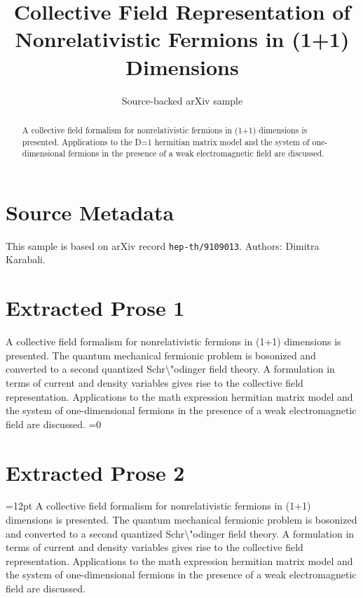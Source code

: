 \documentclass[11pt]{article}
\title{Collective Field Representation of Nonrelativistic Fermions in (1+1)
  Dimensions}
\author{Source-backed arXiv sample}
\date{}
\begin{document}
\maketitle
\begin{abstract}
A collective field formalism for nonrelativistic fermions in (1+1) dimensions is presented. Applications to the D=1 hermitian matrix model and the system of one-dimensional fermions in the presence of a weak electromagnetic field are discussed.
\end{abstract}
\section{Source Metadata}
This sample is based on arXiv record \texttt{hep-th/9109013}. Authors: Dimitra Karabali.
\section{Extracted Prose 1}
A collective field formalism for nonrelativistic fermions in (1+1) dimensions is presented. The quantum mechanical fermionic problem is bosonized and converted to a second quantized Schr\textbackslash{}"odinger field theory. A formulation in terms of current and density variables gives rise to the collective field representation. Applications to the math expression hermitian matrix model and the system of one-dimensional fermions in the presence of a weak electromagnetic field are discussed. =0
\section{Extracted Prose 2}
=12pt A collective field formalism for nonrelativistic fermions in (1+1) dimensions is presented. The quantum mechanical fermionic problem is bosonized and converted to a second quantized Schr\textbackslash{}"odinger field theory. A formulation in terms of current and density variables gives rise to the collective field representation. Applications to the math expression hermitian matrix model and the system of one-dimensional fermions in the presence of a weak electromagnetic field are discussed.
\end{document}
